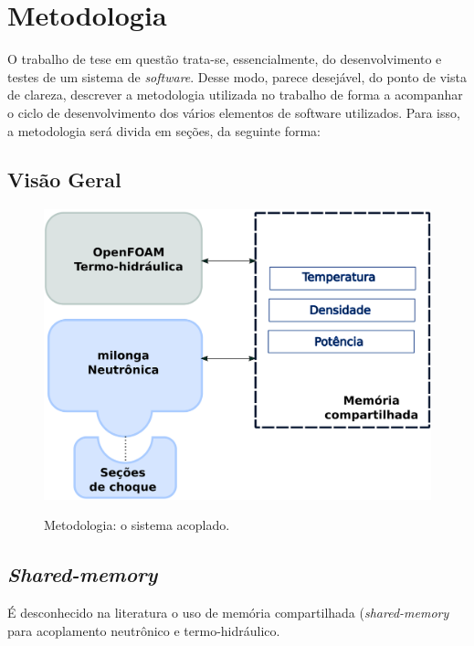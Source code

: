 \chapter{Metodologia}
\label{chap:metodologia}

O trabalho de tese em questão trata-se, essencialmente, do desenvolvimento e testes
de um sistema de \textit{software}. Desse modo, parece desejável, do ponto de vista de
clareza, descrever a metodologia utilizada no trabalho de forma a acompanhar o ciclo
de desenvolvimento dos vários elementos de software utilizados. Para isso, a metodologia
será divida em seções, da seguinte forma:

\section{Visão Geral}

\begin{figure}[htb]
  \caption{Metodologia: o sistema acoplado.}
  \centering\includegraphics[scale=0.7]{figuras/metodologia1.png}
  \label{metodoetapas}
\end{figure}

\section{\textit{Shared-memory}}

É desconhecido na literatura o uso de memória compartilhada (\textit{shared-memory} para
acoplamento neutrônico e termo-hidráulico.


